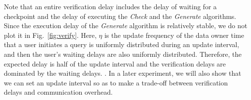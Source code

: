  Note that an entire verification delay includes the delay of waiting for a checkpoint and the delay of executing the {\it Check} and the {\it Generate} algorithms. Since the execution delay of the {\it Generate} algorithm is relatively stable,  we do not plot it in Fig.~\ref{fig:verify}. Here, $\eta$ is the update frequency of the data owner  time that a user initiates a query is uniformly distributed during an update interval, and then the user's waiting delays are also uniformly distributed. Therefore, the expected delay is half of the update interval and the verification delays are dominated by the waiting delays.  
. In a later experiment, we will also show that we can set an update interval so as to make a trade-off between verification delays and communication overhead.
